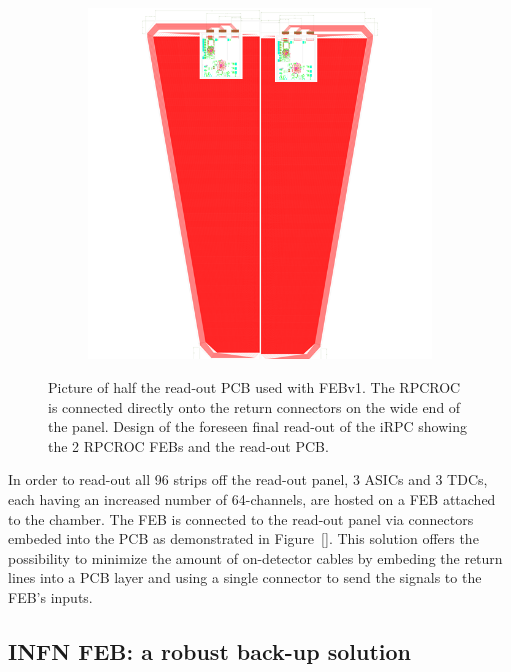 \begin{figure}[H]
\begin{subfigure}{0.6\linewidth}
			\includegraphics[width = \linewidth]{fig/chapt6/iRPC-RPCROC-Final.png}
			\caption{\label{fig:RPCROC_FEB:B}}
		\end{subfigure}
		\caption{\label{fig:RPCROC_FEB}  Picture of half the read-out PCB used with FEBv1. The RPCROC is connected directly onto the return connectors on the wide end of the panel.  Design of the foreseen final read-out of the iRPC showing the 2 RPCROC FEBs and the read-out PCB.}
	\end{figure}
	
	In order to read-out all 96 strips off the read-out panel, 3 ASICs and 3 TDCs, each having an increased number of 64-channels, are hosted on a FEB attached to the chamber. The FEB is connected to the read-out panel via connectors embeded into the PCB as demonstrated in Figure~\ref{}. This solution offers the possibility to minimize the amount of on-detector cables by embeding the return lines into a PCB layer and using a single connector to send the signals to the FEB's inputs.

	\subsection{INFN FEB: a robust back-up solution}
	\label{chapt6:ssec:INFN}
	
